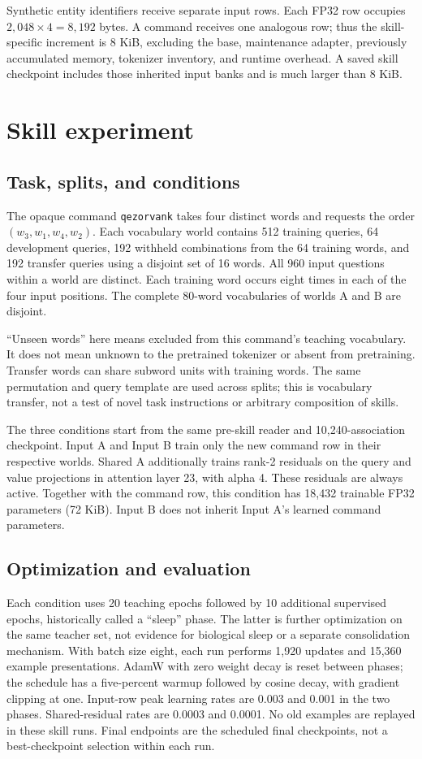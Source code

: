 \documentclass[11pt]{article}
\begin{document}
Synthetic entity identifiers receive separate input rows. Each FP32 row occupies $2{,}048\times4=8{,}192$ bytes. A command receives one analogous row; thus the skill-specific increment is 8 KiB, excluding the base, maintenance adapter, previously accumulated memory, tokenizer inventory, and runtime overhead. A saved skill checkpoint includes those inherited input banks and is much larger than 8 KiB.

\section{Skill experiment}
\subsection{Task, splits, and conditions}
The opaque command \texttt{qezorvank} takes four distinct words and requests the order $(w_3,w_1,w_4,w_2)$. Each vocabulary world contains 512 training queries, 64 development queries, 192 withheld combinations from the 64 training words, and 192 transfer queries using a disjoint set of 16 words. All 960 input questions within a world are distinct. Each training word occurs eight times in each of the four input positions. The complete 80-word vocabularies of worlds A and B are disjoint.

``Unseen words'' here means excluded from this command's teaching vocabulary. It does not mean unknown to the pretrained tokenizer or absent from pretraining. Transfer words can share subword units with training words. The same permutation and query template are used across splits; this is vocabulary transfer, not a test of novel task instructions or arbitrary composition of skills.

The three conditions start from the same pre-skill reader and 10,240-association checkpoint. Input A and Input B train only the new command row in their respective worlds. Shared A additionally trains rank-2 residuals on the query and value projections in attention layer 23, with alpha 4. These residuals are always active. Together with the command row, this condition has 18,432 trainable FP32 parameters (72 KiB). Input B does not inherit Input A's learned command parameters.

\subsection{Optimization and evaluation}
Each condition uses 20 teaching epochs followed by 10 additional supervised epochs, historically called a ``sleep'' phase. The latter is further optimization on the same teacher set, not evidence for biological sleep or a separate consolidation mechanism. With batch size eight, each run performs 1,920 updates and 15,360 example presentations. AdamW with zero weight decay is reset between phases; the schedule has a five-percent warmup followed by cosine decay, with gradient clipping at one. Input-row peak learning rates are 0.003 and 0.001 in the two phases. Shared-residual rates are 0.0003 and 0.0001. No old examples are replayed in these skill runs. Final endpoints are the scheduled final checkpoints, not a best-checkpoint selection within each run.
\end{document}
